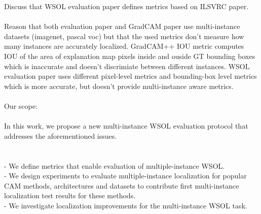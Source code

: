 Discuss that WSOL evaluation paper defines metrics based on ILSVRC paper.\\
\\
Reason that both evaluation paper and GradCAM paper use multi-instance datasets (imagenet, pascal voc) but that the used metrics don't measure how many instances are accurately localized. GradCAM++ IOU metric computes IOU of the area of explanation map pixels inside and ouside GT bounding boxes which is inaccurate and doesn't discrimiate between different instances. WSOL evaluation paper uses different pixel-level metrics and bounding-box level metrics which is more accurate, but doesn't provide multi-instance aware metrics.\\
\\
Our scope:\\
\\
In this work, we propose a new multi-instance WSOL evaluation protocol that addresses the aforementioned issues. \\\\
\\
- We define metrics that enable evaluation of multiple-instance WSOL.\\
- We design experiments to evaluate multiple-instance localization for popular CAM methods, architectures and datasets to contribute first multi-instance localization test results for these methods.\\
- We investigate localization improvements for the multi-instance WSOL task.\\